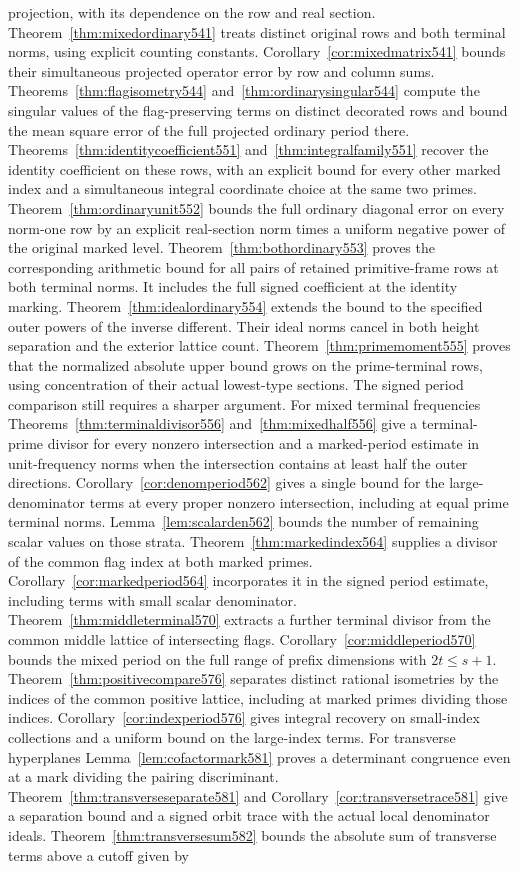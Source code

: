 \documentclass[a4paper,11pt]{article}
\theoremstyle{definition}
\theoremstyle{remark}
\numberwithin{equation}{section}
\begin{document}
projection, with its dependence on the row and real section. Theorem~\ref{thm:mixedordinary541} treats distinct original rows and both terminal norms, using explicit counting constants. Corollary~\ref{cor:mixedmatrix541} bounds their simultaneous projected operator error by row and column sums. Theorems~\ref{thm:flagisometry544} and~\ref{thm:ordinarysingular544} compute the singular values of the flag-preserving terms on distinct decorated rows and bound the mean square error of the full projected ordinary period there. Theorems~\ref{thm:identitycoefficient551} and~\ref{thm:integralfamily551} recover the identity coefficient on these rows, with an explicit bound for every other marked index and a simultaneous integral coordinate choice at the same two primes. Theorem~\ref{thm:ordinaryunit552} bounds the full ordinary diagonal error on every norm-one row by an explicit real-section norm times a uniform negative power of the original marked level. Theorem~\ref{thm:bothordinary553} proves the corresponding arithmetic bound for all pairs of retained primitive-frame rows at both terminal norms. It includes the full signed coefficient at the identity marking. Theorem~\ref{thm:idealordinary554} extends the bound to the specified outer powers of the inverse different. Their ideal norms cancel in both height separation and the exterior lattice count. Theorem~\ref{thm:primemoment555} proves that the normalized absolute upper bound grows on the prime-terminal rows, using concentration of their actual lowest-type sections. The signed period comparison still requires a sharper argument. For mixed terminal frequencies Theorems~\ref{thm:terminaldivisor556} and~\ref{thm:mixedhalf556} give a terminal-prime divisor for every nonzero intersection and a marked-period estimate in unit-frequency norms when the intersection contains at least half the outer directions. Corollary~\ref{cor:denomperiod562} gives a single bound for the large-denominator terms at every proper nonzero intersection, including at equal prime terminal norms. Lemma~\ref{lem:scalarden562} bounds the number of remaining scalar values on those strata. Theorem~\ref{thm:markedindex564} supplies a divisor of the common flag index at both marked primes. Corollary~\ref{cor:markedperiod564} incorporates it in the signed period estimate, including terms with small scalar denominator. Theorem~\ref{thm:middleterminal570} extracts a further terminal divisor from the common middle lattice of intersecting flags. Corollary~\ref{cor:middleperiod570} bounds the mixed period on the full range of prefix dimensions with \(2t\le s+1\). Theorem~\ref{thm:positivecompare576} separates distinct rational isometries by the indices of the common positive lattice, including at marked primes dividing those indices. Corollary~\ref{cor:indexperiod576} gives integral recovery on small-index collections and a uniform bound on the large-index terms. For transverse hyperplanes Lemma~\ref{lem:cofactormark581} proves a determinant congruence even at a mark dividing the pairing discriminant. Theorem~\ref{thm:transverseseparate581} and Corollary~\ref{cor:transversetrace581} give a separation bound and a signed orbit trace with the actual local denominator ideals. Theorem~\ref{thm:transversesum582} bounds the absolute sum of transverse terms above a cutoff given by 
\end{document}
